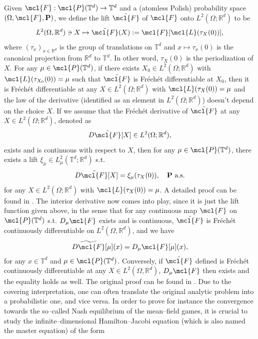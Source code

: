 Given $\mcl{F}: \mcl{P}(\mathbb{T}^d) \to \mathbb{T}^d$ and a (atomless Polish) probability space $(\Omega, \mcl{F}, \mathbf{P})$, we define the lift $\tilde{\mcl{F}}$ of $\mcl{F}$ onto $L^2(\Omega; \mathbb{R}^d)$ to be 
\begin{align*}
L^2(\Omega, \mathbb{R}^d) \ni X \mapsto \tilde{\mcl{F}}(X) := \mcl{F}[\mcl{L}(\tau_X(0))],
\end{align*}
where $(\tau_x)_{x\in\mathbb{R}^d}$ is the group of translations on $\mathbb{T}^d$ and $x \mapsto \tau_x(0)$ is the canonical projection from $\mathbb{R}^d$ to $\mathbb{T}^d$. In other word, $\tau_X(0)$ is the periodization of $X$. For any $\mu \in \mcl{P}(\mathbb{T}^d)$, if there exists $X_0 \in L^2(\Omega; \mathbb{R}^d)$ with $\mcl{L}(\tau_{X_0}(0)) = \mu$ such that $\tilde{\mcl{F}}$ is Fr\'ech\'et differentiable at $X_0$, then it is Fr\'ech\'et differentiable at any $X \in L^2(\Omega; \mathbb{R}^d)$ with $\mcl{L}(\tau_X(0)) = \mu$ and the law of the derivative (identified as an element in $L^2(\Omega; \mathbb{R}^d)$) doesn't depend on the choice $X$. If we assume that the Fr\'ech\'et derivative of $\tilde{\mcl{F}}$ at any $X \in L^2(\Omega; \mathbb{R}^d)$, denoted as 
$$
D\tilde{\mcl{F}}[X] \in L^2(\Omega; \mathbb{R}^d),
$$
exists and is continuous with respect to $X$, then for any $\mu \in \mcl{P}(\mathbb{T}^d)$, there exists a lift $\xi_{\mu} \in L^2_{\mu}(\mathbb{T}^d; \mathbb{R}^d)$ s.t. 
$$
 D\tilde{\mcl{F}}[X] = \xi_{\mu}(\tau_X(0)), \quad \mathbf{P} \ \text{a.s.}
 $$
for any $X \in L^2(\Omega; \mathbb{R}^d)$ with $\mcl{L}(\tau_X(0)) = \mu$. A detailed proof can be found in \cite{C10}. The interior derivative now comes into play, since it is just the lift function given above, in the sense that for any continuous map $\mcl{F}$ on $\mcl{P}(\mathbb{T}^d)$ s.t. $D_{\mu}\mcl{F}$ exists and is continuous, $\tilde{\mcl{F}}$ is Fr\'ech\'et continuously differentiable on $L^2(\Omega, \mathbb{R}^d)$, and we have
\begin{align*}
\widetilde{D\mcl{F}}[\mu](x) = D_{\mu}\mcl{F}[\mu](x),
\end{align*}
for any $x \in \mathbb{T}^d$ and $\mu \in \mcl{P}(\mathbb{T}^d)$. Conversely, if $\tilde{\mcl{F}}$
defined is Fr\'ech\'et continuously differentiable at any $X \in L^2(\Omega, \mathbb{R}^d)$, $D_{\mu}\mcl{F}$ then exists and the equality holds as well. The original proof can be found in \cite{CDLL19}. Due to the covering interpretation, one can often translate the original analytic problem into a probabilistic one, and vice versa. In order to prove for instance the convergence towards the so--called Nash equilibrium of the mean--field games, it is crucial to study the infinite--dimensional Hamilton--Jacobi equation (which is also named the master equation) of the form
